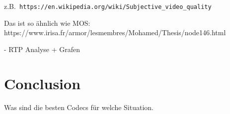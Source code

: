 \documentclass[parskip=full]{scrartcl}
\begin{document}
z.B.\verb| https://en.wikipedia.org/wiki/Subjective_video_quality | 
  
Das ist so ähnlich wie MOS:
https://www.irisa.fr/armor/lesmembres/Mohamed/Thesis/node146.html

- RTP Analyse + Grafen
\section{Conclusion}

Was sind die besten Codecs für welche Situation. 

\printbibliography
\end{document}
